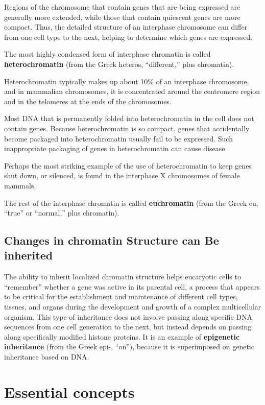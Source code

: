 Regions of the chromosome that contain
genes that are being expressed are generally more extended, while those
that contain quiescent genes are more compact. Thus, the detailed structure
of an interphase chromosome can differ from one cell type to the
next, helping to determine which genes are expressed.

The most highly condensed form of interphase chromatin is called \textbf{heterochromatin}
(from the Greek heteros, “different,” plus chromatin).

Heterochromatin typically makes up about 10\% of an interphase chromosome, and in mammalian
chromosomes, it is concentrated around the centromere region
and in the telomeres at the ends of the chromosomes.

Most DNA that is permanently folded into heterochromatin in the cell
does not contain genes. Because heterochromatin is so compact, genes
that accidentally become packaged into heterochromatin usually fail to
be expressed. Such inappropriate packaging of genes in
heterochromatin can cause disease.

Perhaps the most striking example of the use of heterochromatin to keep
genes shut down, or silenced, is found in the interphase X chromosomes of
female mammals.

The rest of the interphase chromatin is called \textbf{euchromatin} (from the
Greek eu, “true” or “normal,” plus chromatin).

\subsection{Changes in chromatin Structure can Be inherited}

The ability to inherit localized chromatin structure helps eucaryotic cells
to “remember” whether a gene was active in its parental cell, a process
that appears to be critical for the establishment and maintenance of different
cell types, tissues, and organs during the development and growth
of a complex multicellular organism. This type of inheritance does not
involve passing along specific DNA sequences from one cell generation to
the next, but instead depends on passing along specifically modified histone
proteins. It is an example of \textbf{epigenetic inheritance} (from the Greek
epi-, “on”), because it is superimposed on genetic inheritance based on
DNA.

\section{Essential concepts}

